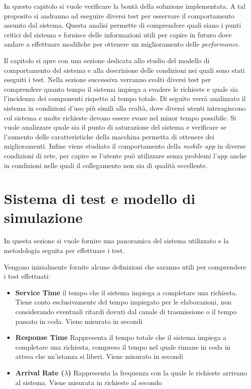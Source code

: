 In questo capitolo si vuole verificare la bontà della soluzione implementata. A tal proposito si andranno ad eseguire diversi test per osservare il comportamento assunto dal sistema. Questa analisi permette di comprendere quali siano i punti critici del sistema e fornisce delle informazioni utili per capire in futuro dove andare a effettuare modifiche per ottenere un miglioramento delle \emph{performance}.

Il capitolo si apre con una sezione dedicata allo studio del modello di comportamento del sistema e alla descrizione delle condizioni nei quali sono stati eseguiti i test. Nella sezione successiva verranno svolti diversi test per comprendere quanto tempo il sistema impiega a evadere le richieste e quale sia l'incidenza dei componenti rispetto al tempo totale. Di seguito verrà analizzato il sistema in condizioni d'uso più simili alla realtà, dove diversi utenti interagiscono col sistema e molte richieste devono essere evase nel minor tempo possibile. Si vuole analizzare quale sia il punto di saturazione del sistema e verificare se l'aumento delle caratteristiche della macchina permetta di ottenere dei miglioramenti. Infine viene studiato il comportamento della \emph{mobile app} in diverse condizioni di rete, per capire se l'utente può utilizzare senza problemi l'\emph{app} anche in condizioni nelle quali il collegamento non sia di qualità eccellente.

\section{Sistema di test e modello di simulazione\label{sec:sistema-e-modello}}

In questa sezione si vuole fornire una panoramica del sistema utilizzato e la metodologia seguita per effettuare i test.

Vengono inizialmente fornite alcune definizioni che saranno utili per comprendere i test effettuati:

\begin{itemize}
	\item \textbf{Service Time}
	\upe il tempo che il sistema impiega a completare una richiesta. Tiene conto esclusivamente del tempo impiegato per le elaborazioni, non considerando eventuali ritardi dovuti dal canale di trasmissione o il tempo passato in coda. Viene misurato in secondi
	\item \textbf{Response Time}
	Rappresenta il tempo totale che il sistema impiega a completare una richiesta, compreso il tempo nel quale rimane in coda in attesa che un'istanza si liberi. Viene misurato in secondi
	\item \textbf{Arrival Rate ($ \lambda $)}
	Rappresenta la frequenza con la quale le richieste arrivano al sistema. Viene misurata in richieste al secondo
\end{itemize}


